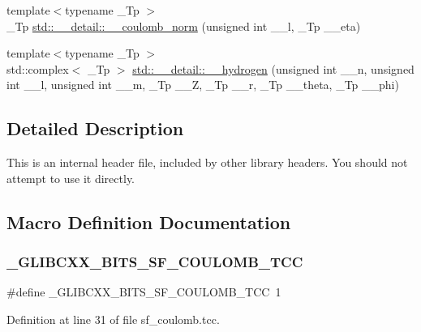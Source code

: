 \begin{DoxyCompactItemize}
\item 
{\footnotesize template$<$typename \+\_\+\+Tp $>$ }\\\+\_\+\+Tp \hyperlink{namespacestd_1_1____detail_a568c1e2b831de815e9ffb1b9c9fe1170}{std\+::\+\_\+\+\_\+detail\+::\+\_\+\+\_\+coulomb\+\_\+norm} (unsigned int \+\_\+\+\_\+l, \+\_\+\+Tp \+\_\+\+\_\+eta)
\item 
{\footnotesize template$<$typename \+\_\+\+Tp $>$ }\\std\+::complex$<$ \+\_\+\+Tp $>$ \hyperlink{namespacestd_1_1____detail_aba60bcf9f002dc900042065999546bc9}{std\+::\+\_\+\+\_\+detail\+::\+\_\+\+\_\+hydrogen} (unsigned int \+\_\+\+\_\+n, unsigned int \+\_\+\+\_\+l, unsigned int \+\_\+\+\_\+m, \+\_\+\+Tp \+\_\+\+\_\+Z, \+\_\+\+Tp \+\_\+\+\_\+r, \+\_\+\+Tp \+\_\+\+\_\+theta, \+\_\+\+Tp \+\_\+\+\_\+phi)
\end{DoxyCompactItemize}


\subsection{Detailed Description}
This is an internal header file, included by other library headers. You should not attempt to use it directly. 

\subsection{Macro Definition Documentation}
\mbox{\label{sf__coulomb_8tcc_a162e29800b43ed4d5f024cda4a7a6531}} 
\subsubsection{\texorpdfstring{\+\_\+\+G\+L\+I\+B\+C\+X\+X\+\_\+\+B\+I\+T\+S\+\_\+\+S\+F\+\_\+\+C\+O\+U\+L\+O\+M\+B\+\_\+\+T\+CC}{\_GLIBCXX\_BITS\_SF\_COULOMB\_TCC}}
{\footnotesize\ttfamily \#define \+\_\+\+G\+L\+I\+B\+C\+X\+X\+\_\+\+B\+I\+T\+S\+\_\+\+S\+F\+\_\+\+C\+O\+U\+L\+O\+M\+B\+\_\+\+T\+CC~1}



Definition at line 31 of file sf\+\_\+coulomb.\+tcc.

